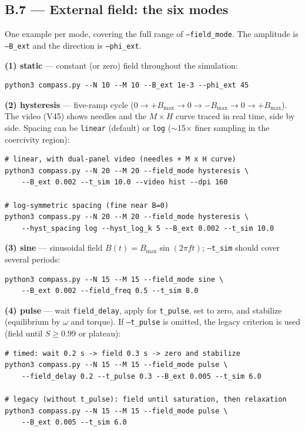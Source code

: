 \documentclass[11pt,a4paper]{article}
\newcommand{\code}[1]{\texttt{#1}}
\begin{document}
\subsection*{B.7 --- External field: the six modes}

One example per mode, covering the full range of \code{--field\_mode}. The amplitude is \code{--B\_ext} and the direction is \code{--phi\_ext}.

\medskip\noindent\textbf{(1) static} --- constant (or zero) field throughout the simulation:
\begin{verbatim}
python3 compass.py --N 10 --M 10 --B_ext 1e-3 --phi_ext 45
\end{verbatim}

\noindent\textbf{(2) hysteresis} --- five-ramp cycle ($0 \to +B_{\max} \to 0 \to -B_{\max} \to 0 \to +B_{\max}$). The video (V45) shows needles and the $M\times H$ curve traced in real time, side by side. Spacing can be \code{linear} (default) or \code{log} ($\sim$15$\times$ finer sampling in the coercivity region):
\begin{verbatim}
# linear, with dual-panel video (needles + M x H curve)
python3 compass.py --N 20 --M 20 --field_mode hysteresis \
    --B_ext 0.002 --t_sim 10.0 --video hist --dpi 160

# log-symmetric spacing (fine near B=0)
python3 compass.py --N 20 --M 20 --field_mode hysteresis \
    --hyst_spacing log --hyst_log_k 5 --B_ext 0.002 --t_sim 10.0
\end{verbatim}

\noindent\textbf{(3) sine} --- sinusoidal field $B(t) = B_{\max}\sin(2\pi f t)$; \code{--t\_sim} should cover several periods:
\begin{verbatim}
python3 compass.py --N 15 --M 15 --field_mode sine \
    --B_ext 0.002 --field_freq 0.5 --t_sim 8.0
\end{verbatim}

\noindent\textbf{(4) pulse} --- wait \code{field\_delay}, apply for \code{t\_pulse}, set to zero, and stabilize (equilibrium by $\omega$ and torque). If \code{--t\_pulse} is omitted, the legacy criterion is used (field until $S \geq 0.99$ or plateau):
\begin{verbatim}
# timed: wait 0.2 s -> field 0.3 s -> zero and stabilize
python3 compass.py --N 15 --M 15 --field_mode pulse \
    --field_delay 0.2 --t_pulse 0.3 --B_ext 0.005 --t_sim 6.0

# legacy (without t_pulse): field until saturation, then relaxation
python3 compass.py --N 15 --M 15 --field_mode pulse \
    --B_ext 0.005 --t_sim 6.0
\end{verbatim}
\end{document}
